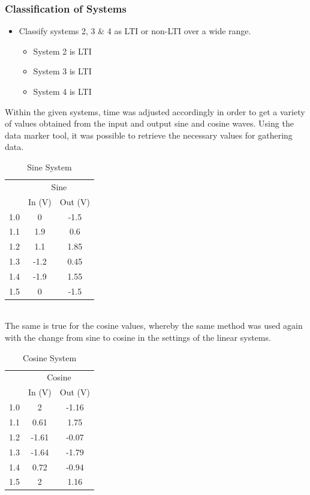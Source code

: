 \documentclass[12pt]{article}
\begin{document}
\subsubsection{Classification of Systems}
\begin{itemize}
\item Classify systems 2, 3 \& 4 as LTI or non-LTI over a wide range.
\begin{itemize}
\item System 2 is LTI
\item System 3 is LTI
\item System 4 is LTI
\end{itemize}
\end{itemize}
Within the given systems, time was adjusted accordingly in order to get a variety of values obtained from the input and output sine and cosine waves. Using the data marker tool, it was possible to retrieve the necessary values for gathering data.
\begin{table}[h]
\centering
\begin{tabular}{ccc}
    & \multicolumn{2}{c}{Sine} \\
    & In (V)          & Out (V)        \\
1.0 & 0           & -1.5       \\
1.1 & 1.9         & 0.6        \\
1.2 & 1.1         & 1.85       \\
1.3 & -1.2        & 0.45       \\
1.4 & -1.9        & 1.55       \\
1.5 & 0           & -1.5      
\end{tabular}
\caption{Sine System}
\end{table}\\
The same is true for the cosine values, whereby the same method was used again with the change from sine to cosine in the settings of the linear systems.\\
\begin{table}[h]
\centering
\begin{tabular}{ccc}
    & \multicolumn{2}{c}{Cosine} \\
    & In (V)          & Out (V)        \\
1.0 & 2           & -1.16       \\
1.1 & 0.61         & 1.75        \\
1.2 & -1.61         & -0.07       \\
1.3 & -1.64        & -1.79       \\
1.4 & 0.72        & -0.94       \\
1.5 & 2           & 1.16      
\end{tabular}
\caption{Cosine System}
\end{table}
\end{document}
